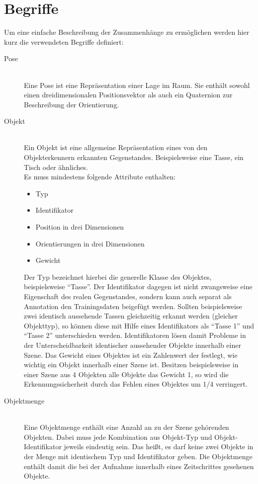 \section{Begriffe}
Um eine einfache Beschreibung der Zusammenhänge zu ermöglichen werden hier kurz die verwendeten Begriffe definiert:
\begin{description}
  \item[Pose] \hfill \\
  Eine Pose ist eine Repräsentation einer Lage im Raum.
  Sie enthält sowohl einen dreidimensionalen Positionsvektor als auch ein Quaternion zur Beschreibung der Orientierung.

  \item[Objekt] \hfill \\
  Ein Objekt ist eine allgemeine Repräsentation eines von den Objekterkennern erkannten Gegenstandes.
  Beispielsweise eine Tasse, ein Tisch oder ähnliches.\\
  Es muss mindestens folgende Attribute enthalten:
  \begin{itemize}
    \item Typ
    \item Identifikator
    \item Position in drei Dimensionen
    \item Orientierungen in drei Dimensionen
    \item Gewicht
  \end{itemize}

  Der Typ bezeichnet hierbei die generelle Klasse des Objektes, beispielsweise "`Tasse"'.
  Der Identifikator dagegen ist nicht zwangsweise eine Eigenschaft des realen Gegenstandes, sondern kann auch separat als Annotation den Trainingsdaten beigefügt werden.
  Sollten beispielsweise zwei identisch aussehende Tassen gleichzeitig erkannt werden (gleicher Objekttyp), so können diese mit Hilfe eines Identifikators als "`Tasse 1"' und "`Tasse 2"' unterschieden werden.
  Identifikatoren lösen damit Probleme in der Unterscheidbarkeit identischer aussehender Objekte innerhalb einer Szene.
  Das Gewicht eines Objektes ist ein Zahlenwert der festlegt, wie wichtig ein Objekt innerhalb einer Szene ist.
  Besitzen beispielsweise in einer Szene aus 4 Objekten alle Objekte das Gewicht 1, so wird die Erkennungssicherheit durch das Fehlen eines Objektes um 1/4 verringert.

  \item[Objektmenge] \hfill \\
  Eine Objektmenge enthält eine Anzahl an zu der Szene gehörenden Objekten.
  Dabei muss jede Kombination aus Objekt-Typ und Objekt-Identifikator jeweils eindeutig sein.
  Das heißt, es darf keine zwei Objekte in der Menge mit identischem Typ und Identifikator geben.
  Die Objektmenge enthält damit die bei der Aufnahme innerhalb eines Zeitschrittes gesehenen Objekte.


\end{description}
